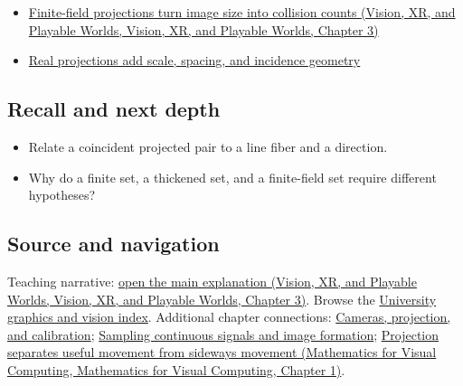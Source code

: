 \begin{itemize}
\tightlist
\item
  \href{../07-Vision-XR-and-Playable-Worlds/main.pdf\#nameddest=04-visual-computing-ii-ch032-finite-field-projections-turn-image-size-into-collision-counts}{Finite-field projections turn image size into collision counts (Vision, XR, and Playable Worlds, Vision, XR, and Playable Worlds, Chapter 3)}
\item
  \hyperref[04-visual-computing-ii-ch033-real-projections-add-scale-spacing-and-incidence-geometry]{Real projections add scale, spacing, and incidence geometry}
\end{itemize}

\subsection{Recall and next depth}\label{appendix-3c73f7862157-recall-and-next-depth}

\begin{itemize}
\tightlist
\item
  Relate a coincident projected pair to a line fiber and a direction.
\item
  Why do a finite set, a thickened set, and a finite-field set require different hypotheses?
\end{itemize}

\subsection{Source and navigation}\label{appendix-3c73f7862157-source-and-navigation}

Teaching narrative: \href{../07-Vision-XR-and-Playable-Worlds/main.pdf\#nameddest=04-visual-computing-ii-ch032-finite-field-projections-turn-image-size-into-collision-counts}{open the main explanation (Vision, XR, and Playable Worlds, Vision, XR, and Playable Worlds, Chapter 3)}. Browse the \hyperref[appendix-a6d556a4ef50-university-graphics-vision-and-photography---independent-series]{University graphics and vision index}. Additional chapter connections: \hyperref[03-visual-computing-i-ch003-cameras-projection-and-calibration]{Cameras, projection, and calibration}; \hyperref[03-visual-computing-i-ch003-sampling-continuous-signals-and-image-formation]{Sampling continuous signals and image formation}; \href{../02-Mathematics-for-Visual-Computing/main.pdf\#nameddest=01-foundations-i-ch017-projection-separates-useful-movement-from-sideways-movement}{Projection separates useful movement from sideways movement (Mathematics for Visual Computing, Mathematics for Visual Computing, Chapter 1)}.

